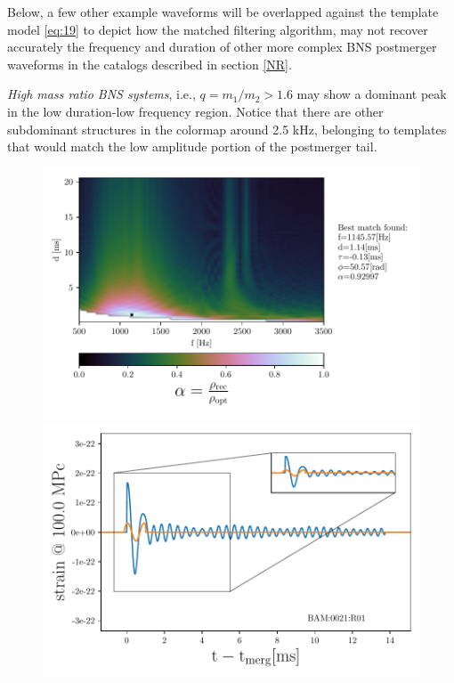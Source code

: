 \FloatBarrier

Below, a few other example waveforms will be overlapped against the template model \ref{eq:19} to depict how the matched filtering algorithm, may not recover accurately the frequency and duration of other more complex BNS postmerger waveforms in the catalogs described in section \ref{NR}.
 

\textit{High mass ratio BNS systems}, i.e., $q=m_1/m_2>1.6$ may show a dominant peak in the low duration-low frequency region. Notice that there are other subdominant structures in the colormap around 2.5 kHz, belonging to templates that would match the low amplitude portion of the postmerger tail.

\begin{figure}[!htbp]
\begin{center}
\begin{minipage}[t]{0.5\linewidth}
\vspace{0pt}
\includegraphics[scale=0.6,trim={2mm 0 35mm 0},clip]{images/Data_analysis/results/2D_grid_3.pdf}
\end{minipage}%
\begin{minipage}[t]{0.5\linewidth}
\vspace{20pt}
\includegraphics[scale=0.45]{images/Data_analysis/results/2D_grid_4.pdf}

\end{minipage}
\end{center}
\end{figure}
